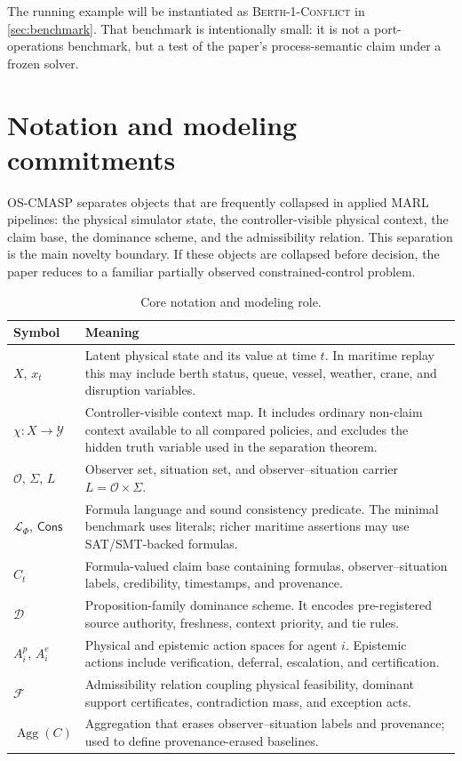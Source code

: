 \documentclass[11pt]{article}
\newcommand{\OSCMASP}{\mbox{\normalfont\textsc{OS-CMASP}}}
\newcommand{\Lang}{\mathcal L}
\newcommand{\Cons}{\mathsf{Cons}}
\newcommand{\Agg}{\operatorname{Agg}}
\newcommand{\1}{\mathbf{1}}
\theoremstyle{definition}
\theoremstyle{plain}
\theoremstyle{remark}
\begin{document}
The running example will be instantiated as \textsc{Berth-1-Conflict} in \cref{sec:benchmark}. That benchmark is intentionally small: it is not a port-operations benchmark, but a test of the paper's process-semantic claim under a frozen solver.

\section{Notation and modeling commitments}
\label{sec:notation}

\OSCMASP{} separates objects that are frequently collapsed in applied MARL pipelines: the physical simulator state, the controller-visible physical context, the claim base, the dominance scheme, and the admissibility relation. This separation is the main novelty boundary. If these objects are collapsed before decision, the paper reduces to a familiar partially observed constrained-control problem.

\begin{table}[H]
\centering
\caption{Core notation and modeling role.}
\label{tab:notation}
\small
\begin{tabularx}{\textwidth}{@{}L{0.20\textwidth}Y@{}}
\toprule
Symbol & Meaning \\
\midrule
$X$, $x_t$ & Latent physical state and its value at time $t$. In maritime replay this may include berth status, queue, vessel, weather, crane, and disruption variables. \\
$\chi:X\to\mathcal Y$ & Controller-visible context map. It includes ordinary non-claim context available to all compared policies, and excludes the hidden truth variable used in the separation theorem. \\
$\mathcal O$, $\Sigma$, $L$ & Observer set, situation set, and observer--situation carrier $L=\mathcal O\times\Sigma$. \\
$\Lang_\Phi$, $\Cons$ & Formula language and sound consistency predicate. The minimal benchmark uses literals; richer maritime assertions may use SAT/SMT-backed formulas. \\
$C_t$ & Formula-valued claim base containing formulas, observer--situation labels, credibility, timestamps, and provenance. \\
$\mathcal D$ & Proposition-family dominance scheme. It encodes pre-registered source authority, freshness, context priority, and tie rules. \\
$A_i^p$, $A_i^e$ & Physical and epistemic action spaces for agent $i$. Epistemic actions include verification, deferral, escalation, and certification. \\
$\mathcal F$ & Admissibility relation coupling physical feasibility, dominant support certificates, contradiction mass, and exception acts. \\
$\Agg(C)$ & Aggregation that erases observer--situation labels and provenance; used to define provenance-erased baselines. \\
\bottomrule
\end{tabularx}
\end{table}
\end{document}
